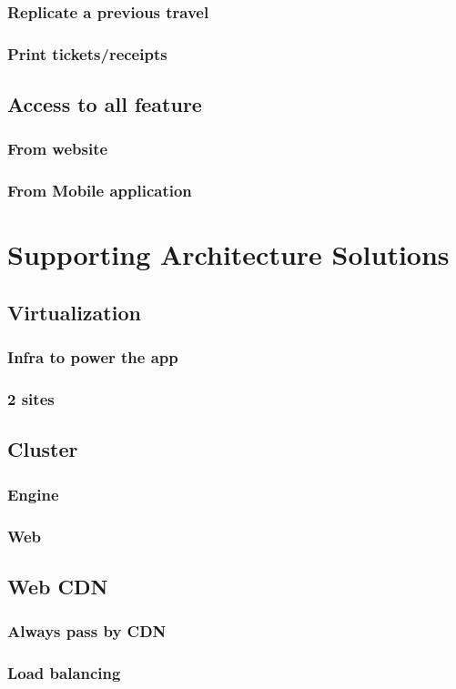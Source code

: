 \documentclass[a4paper,10pt]{report}
\begin{document}
    \section{Replicate a previous travel}
    \section{Print tickets/receipts}
  \chapter{Access to all feature}
    \section{From website}
    \section{From Mobile application}
\part{Supporting Architecture Solutions}
  \chapter{Virtualization}
    \section{Infra to power the app}
    \section{2 sites}
  \chapter{Cluster}
    \section{Engine}
    \section{Web}
  \chapter{Web CDN}
    \section{Always pass by CDN}
    \section{Load balancing}
\end{document}
